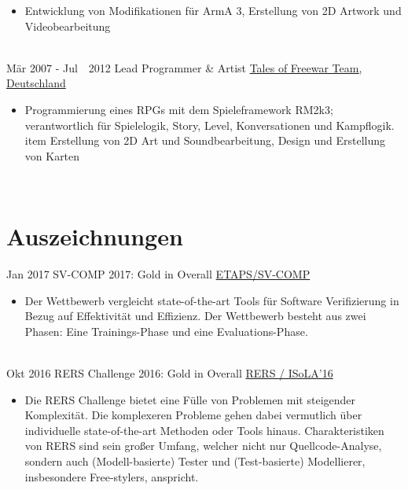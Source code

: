 \documentclass[letterpaper]{twentysecondcv_german} %
\begin{document}
\begin{twenty}
{\begin{itemize}
        			\item Entwicklung von Modifikationen für ArmA 3, Erstellung von 2D Artwork und Videobearbeitung
        		\end{itemize}}\\
	\twentyitem
    		{Mär 2007 -}
		{Jul~\, 2012}
        		{Lead Programmer \& Artist}
        		{\href{https://github.com/ZabuzaW/TalesOfFreewar}{Tales of Freewar Team, Deutschland}}
        		{}
        		{\begin{itemize}
        			\item Programmierung eines RPGs mit dem Spieleframework RM2k3; verantwortlich für
        			Spielelogik, Story, Level, Konversationen und Kampflogik.
        			item Erstellung von 2D Art und Soundbearbeitung, Design und Erstellung von Karten
        		\end{itemize}}\\
\end{twenty}


\section{Auszeichnungen}
\begin{twenty} %
	\twentyitem
    		{Jan 2017}
		{}
        		{SV-COMP 2017: Gold in Overall}
        		{\href{https://sv-comp.sosy-lab.org/2017/}{ETAPS/SV-COMP}}
        		{}
        		{\begin{itemize}
        			\item Der Wettbewerb vergleicht state-of-the-art Tools für Software Verifizierung
        			in Bezug auf Effektivität und Effizienz. Der Wettbewerb besteht aus zwei Phasen:
        			Eine Trainings-Phase und eine Evaluations-Phase.
        		\end{itemize}}\\
        	\twentyitem
    		{Okt 2016}
		{}
        		{RERS Challenge 2016: Gold in Overall}
        		{\href{http://rers-challenge.org/2016/}{RERS / ISoLA'16}}
        		{}
        		{\begin{itemize}
        			\item Die RERS Challenge bietet eine Fülle von Problemen mit steigender Komplexität.
        			Die komplexeren Probleme gehen dabei vermutlich über individuelle state-of-the-art
        			Methoden oder Tools hinaus. Charakteristiken von RERS sind sein großer Umfang, welcher
        			nicht nur Quellcode-Analyse, sondern auch (Modell-basierte) Tester und (Test-basierte)
        			Modellierer, insbesondere Free-stylers, anspricht.
        		\end{itemize}}\\
\end{twenty}
\end{document}
